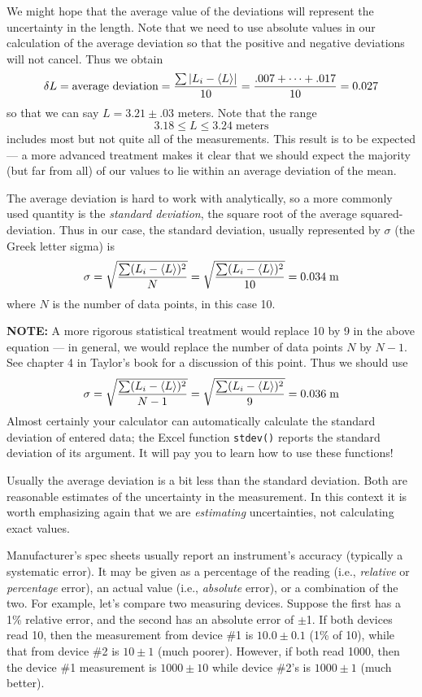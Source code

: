      We might hope that the average value of the deviations will
represent the uncertainty in the length.  Note that we need to
use absolute values in our calculation of the average deviation so that the
positive and negative deviations will not cancel.  Thus we
obtain
\[
\delta L = \mbox{average deviation} = {{\sum |L_{i} - \langle L \rangle|}
  \over {10}} = {{.007 + \cdots + .017} \over {10}} = 0.027
\]
so that we can say $L = 3.21 \pm .03$ meters.  Note that the range
\[
         3.18 \leq L \leq 3.24 \;\mbox{meters}
\]
includes most but not quite all of the measurements.  This result
is to be expected --- a more advanced treatment makes it clear that
we should expect the majority (but far from all) of our values to lie within an
average deviation of the mean.

     The average deviation is hard to work with analytically,
so a more commonly used quantity is the {\em standard
deviation}, the square root of the average squared-deviation.  
Thus in our case, the standard deviation, usually
represented by $\sigma$ (the Greek letter sigma) is
\[
\sigma = \sqrt{ {{\sum (L_{i} - \langle L \rangle)^{2}} \over N}}
 = \sqrt{ {{\sum (L_{i} - \langle L \rangle)^{2}} \over {10}}}
     = 0.034 \;\mbox{m}
\]
where $N$ is the number of data points, in this case 10.

{\bf NOTE:}  A more rigorous statistical treatment would 
replace 10 by 9 in the above equation --- in general, we would
replace the number of data points $N$ by $N-1$.  See chapter 4 
in Taylor's book for
a discussion of this point.  Thus we should use
\[
\sigma = \sqrt{ {{\sum (L_{i} - \langle L \rangle)^{2}} \over {N-1}}}
 =  \sqrt{ {{\sum (L_{i} - \langle L \rangle)^{2}} \over {9}}}
     = 0.036 \;\mbox{m}
\]
Almost certainly your calculator can automatically
calculate the standard deviation of entered data; the Excel
function {\tt stdev()} reports the standard deviation of
its argument.  It will pay you to learn
how to use these functions!

Usually the average deviation is a bit
less than the standard deviation.  
Both are reasonable
estimates of the uncertainty in the measurement.  In this context
it is worth emphasizing again that we are {\em estimating}
uncertainties, not calculating exact values.

Manufacturer's spec sheets usually report an instrument's accuracy
(typically a systematic error).
It may be given as a percentage of the
reading (i.e., {\em relative} or {\em percentage}  error), an actual value (i.e., {\em absolute}
error), or a combination of the two.  For
example, let's compare two measuring devices.   Suppose the first has
a 1\%
relative error, and the second has an absolute error of $\pm$1.
If both devices read 10, then the measurement from device \#1 is
$10.0 \pm 0.1$ (1\% of 10), while that from device \#2 is $10 \pm 1$ (much
poorer).  However, if both read 1000, then the device \#1
measurement is $1000 \pm 10$ while device \#2's is $1000 \pm 1$ (much
better).

